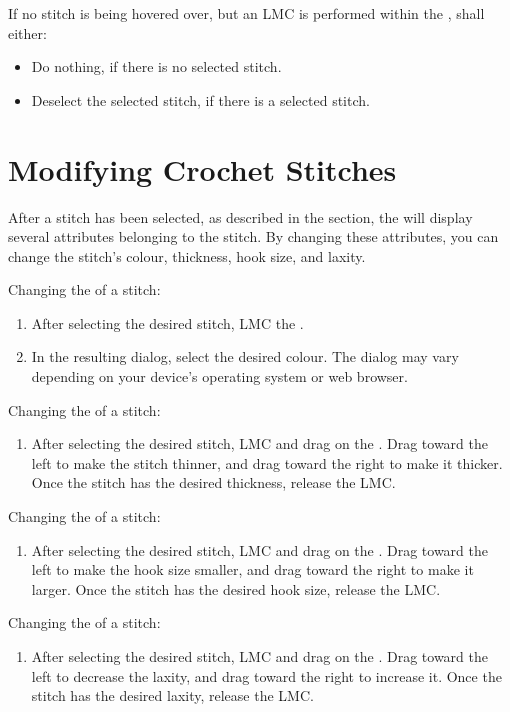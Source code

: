 \documentclass[main.tex]{subfiles}
\begin{document}
If no stitch is being hovered over, but an LMC is performed within the \CRW, \CC{} shall either:
\begin{itemize}
\item Do nothing, if there is no selected stitch.
\item Deselect the selected stitch, if there is a selected stitch.
\end{itemize}

\section{Modifying Crochet Stitches}

After a stitch has been selected, as described in the  section, the \PropSidebar* will display several attributes belonging to the stitch. By changing these attributes, you can change the stitch's colour, thickness, hook size, and laxity.

Changing the  of a stitch:
\begin{enumerate}
\item After selecting the desired stitch, LMC the \YCP*.
\item In the resulting dialog, select the desired colour. The dialog may vary depending on your device's operating system or web browser.
\end{enumerate}

Changing the  of a stitch:
\begin{enumerate}
\item After selecting the desired stitch, LMC and drag on the \YTS*. Drag toward the left to make the stitch thinner, and drag toward the right to make it thicker. Once the stitch has the desired thickness, release the LMC.
\end{enumerate}

Changing the  of a stitch:
\begin{enumerate}
\item After selecting the desired stitch, LMC and drag on the \HSS*. Drag toward the left to make the hook size smaller, and drag toward the right to make it larger. Once the stitch has the desired hook size, release the LMC.
\end{enumerate}

Changing the  of a stitch:
\begin{enumerate}
\item After selecting the desired stitch, LMC and drag on the \SLS*. Drag toward the left to decrease the laxity, and drag toward the right to increase it. Once the stitch has the desired laxity, release the LMC.
\end{enumerate}
\end{document}
